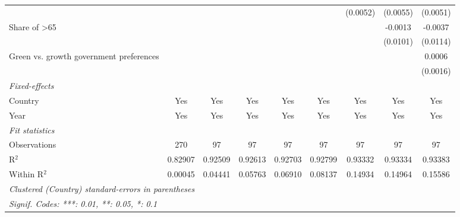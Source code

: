 \begin{table}[htbp]
\begin{tabular}{lcccccccc}
                                              &          &          &          &              &              & (0.0052)     & (0.0055)      & (0.0051)\\   
      Share of >65                            &          &          &          &              &              &              & -0.0013       & -0.0037\\   
                                              &          &          &          &              &              &              & (0.0101)      & (0.0114)\\   
      Green vs. growth government preferences &          &          &          &              &              &              &               & 0.0006\\   
                                              &          &          &          &              &              &              &               & (0.0016)\\   
      \midrule
      \emph{Fixed-effects}\\
      Country                                 & Yes      & Yes      & Yes      & Yes          & Yes          & Yes          & Yes           & Yes\\  
      Year                                    & Yes      & Yes      & Yes      & Yes          & Yes          & Yes          & Yes           & Yes\\  
      \midrule
      \emph{Fit statistics}\\
      Observations                            & 270      & 97       & 97       & 97           & 97           & 97           & 97            & 97\\  
      R$^2$                                   & 0.82907  & 0.92509  & 0.92613  & 0.92703      & 0.92799      & 0.93332      & 0.93334       & 0.93383\\  
      Within R$^2$                            & 0.00045  & 0.04441  & 0.05763  & 0.06910      & 0.08137      & 0.14934      & 0.14964       & 0.15586\\  
      \midrule \midrule
      \multicolumn{9}{l}{\emph{Clustered (Country) standard-errors in parentheses}}\\
      \multicolumn{9}{l}{\emph{Signif. Codes: ***: 0.01, **: 0.05, *: 0.1}}\\
   \end{tabular}
\end{table}


